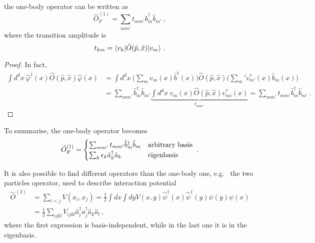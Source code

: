     the one-body operator can be written as
    \begin{equation}
        \hat O^{(1)}_F = \sum_{mm'} t_{mm'} \hat b_m^\dagger \hat b_{m'} ~,
    \end{equation}
    where the transition amplitude is
    \begin{equation}\label{genbas}
        t_{km} = \langle v_k\vert \hat O (\hat p, \hat x) \vert v_m\rangle ~.
    \end{equation}
    \begin{proof}
        In fact,
        \begin{equation*}
        \begin{aligned}
            \int d^d x ~ \hat \varphi^\dagger (x) \hat O (\hat p, \hat x) \hat \varphi (x) & = \int d^d x ~ \Big ( \sum_m v_m(x) \hat b^\dagger (x) \Big ) \hat O (\hat p, \hat x) \Big ( \sum_m' v_{m'}^* (x) \hat b_m (x) \Big ) \\ & = \sum_{mm'} \hat b_m^\dagger \hat b_{m'} \underbrace{\int d^d x ~ v_m (x) \hat O(\hat p, \hat x) v^*_{mi} (x)}_{t_{mm'}} = \sum_{mm'} t_{mm'} \hat b_m^\dagger \hat b_{m'} ~.
        \end{aligned}
        \end{equation*}
    \end{proof}

    To summarise, the one-body operator becomes
    \begin{equation*}
        \hat O^{(1)}_F = \begin{cases}
            \sum_{m m'} t_{mm'} \hat b^\dagger_m \hat b_m & \textnormal{arbitrary basis} \\
            \sum_k \epsilon_k \hat a^\dagger_k \hat a_k & \textnormal{eigenbasis} \\
        \end{cases} ~.
    \end{equation*}

    It is also possible to find different operators than the one-body one, e.g.~ the two particles operator, used to describe interaction potential 
    \begin{equation*}
    \begin{aligned}
        \hat O^{(2)} & = \sum_{i < j} V(x_i, x_j) = \frac{1}{2} \int dx \int dy V(x,y) \hat \psi^\dagger (x) \hat \psi^\dagger (y) \psi(y) \psi (x) \\ & = \frac{1}{2} \sum_{ijkl} V_{ijkl} \hat a_i^\dagger \hat a_j^\dagger \hat a_k \hat a_l ~,
    \end{aligned}
    \end{equation*}
    where the first expression is basis-independent, while in the last one it is in the eigenbasis. 

